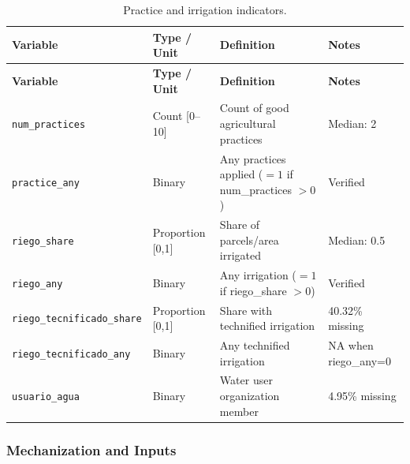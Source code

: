 \documentclass[11pt,a4paper]{article}
\begin{document}
\begin{longtable}{L{3cm}L{2.5cm}L{5cm}L{3.5cm}}
\caption{Practice and irrigation indicators.} \\
\toprule
\textbf{Variable} & \textbf{Type / Unit} & \textbf{Definition} & \textbf{Notes} \\
\midrule
\endfirsthead
\toprule
\textbf{Variable} & \textbf{Type / Unit} & \textbf{Definition} & \textbf{Notes} \\
\midrule
\endhead
\bottomrule
\endlastfoot
\texttt{num\_practices} & Count [0--10] & Count of good agricultural practices & Median: 2 \\
\texttt{practice\_any} & Binary & Any practices applied ($=1$ if num\_practices $>0$) & Verified \\
\texttt{riego\_share} & Proportion [0,1] & Share of parcels/area irrigated & Median: 0.5 \\
\texttt{riego\_any} & Binary & Any irrigation ($=1$ if riego\_share $>0$) & Verified \\
\texttt{riego\_tecnificado\_share} & Proportion [0,1] & Share with technified irrigation & 40.32\% missing \\
\texttt{riego\_tecnificado\_any} & Binary & Any technified irrigation & NA when riego\_any=0 \\
\texttt{usuario\_agua} & Binary & Water user organization member & 4.95\% missing \\
\end{longtable}

\subsubsection{Mechanization and Inputs}
\end{document}
